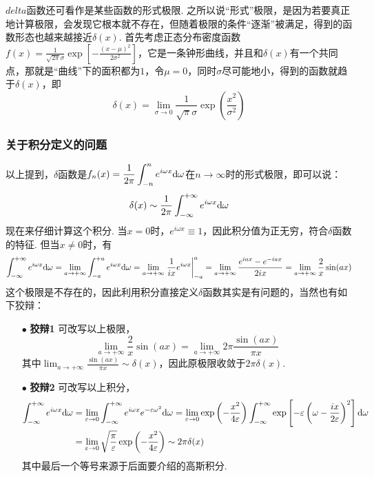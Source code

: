 \documentclass[UTF8]{ctexart}
\newcommand{\trm}[1]{{\rm #1}}
\begin{document}
\(delta\)函数还可看作是某些函数的形式极限. 之所以说“形式”极限，是因为若要真正地计算极限，会发现它根本就不存在，但随着极限的条件“逐渐”被满足，得到的函数形态也越来越接近\(\delta(x)\). 首先考虑正态分布密度函数\(\displaystyle{f(x) = \frac{1}{\sqrt{2\pi}\sigma}\exp\left[-\frac{(x-\mu)^2}{2\sigma^2}\right]}\)，它是一条钟形曲线，并且和\(\delta(x)\)有一个共同点，那就是“曲线”下的面积都为\(1\)，令\(\mu=0\)，同时\(\sigma\)尽可能地小，得到的函数就趋于\(\delta(x)\)，即
\[\delta(x) = \lim_{\sigma \to 0} \frac{1}{\sqrt{\pi}\sigma}\exp\left(\frac{x^2}{\sigma^2}\right)\]

\subsubsection{关于积分定义的问题}

以上提到，\(\delta\)函数是\(\displaystyle{f_n(x) = \frac{1}{2\pi}\int_{-n}^{n}e^{i\omega x}\trm{d}\omega}\)在\(n \to \infty\)时的形式极限，即可以说：
\[\delta(x) \sim \frac{1}{2\pi}\int_{-\infty}^{+\infty}e^{i\omega x}\trm{d}\omega\]
现在来仔细计算这个积分. 当\(x=0\)时，\(e^{i\omega x} \equiv 1\)，因此积分值为正无穷，符合\(\delta\)函数的特征. 但当\(x \neq 0\)时，有
\[\int_{-\infty}^{+\infty}e^{i\omega x}\trm{d}\omega = \lim_{a \to +\infty} \int_{-a}^{+a}e^{i\omega x}\trm{d}\omega = \lim_{a \to +\infty}\left.\frac{1}{ix}e^{i\omega x}\right|_{-a}^{a} = \lim_{a \to +\infty}\frac{e^{iax}-e^{-iax}}{2ix} = \lim_{a \to +\infty}\frac{2}{x}\sin(ax)\]
这个极限是不存在的，因此利用积分直接定义\(\delta\)函数其实是有问题的，当然也有如下狡辩：
\begin{itemize}
    \item [\(\bullet\)] \textbf{狡辩1} 可改写以上极限，
    \[\lim_{a \to +\infty}\frac{2}{x}\sin(ax) = \lim_{a \to +\infty}2\pi \frac{\sin(ax)}{\pi x}\] 
    其中\(\displaystyle{\lim_{a \to +\infty}\frac{\sin(ax)}{\pi x} \sim \delta(x)}\)，因此原极限收敛于\(2\pi\delta(x)\).
    \item[\(\bullet\)] \textbf{狡辩2} 可改写以上积分，
    \begin{align*}
        \int_{-\infty}^{+\infty}e^{i\omega x}\trm{d}\omega &= \lim_{\varepsilon \to 0}\int_{-\infty}^{+\infty}e^{i\omega x}e^{-\varepsilon\omega^2}\trm{d}\omega = \lim_{\varepsilon \to 0}\exp\left(-\frac{x^2}{4\varepsilon}\right)\int_{-\infty}^{+\infty}\exp\left[-\varepsilon\left(\omega-\frac{ix}{2\varepsilon}\right)^2\right]\trm{d}\omega \\
        &= \lim_{\varepsilon \to 0}\sqrt{\frac{\pi}{\varepsilon}}\exp\left(-\frac{x^2}{4\varepsilon}\right) \sim 2\pi \delta(x)
    \end{align*}
    其中最后一个等号来源于后面要介绍的高斯积分.
\end{itemize}
\end{document}
